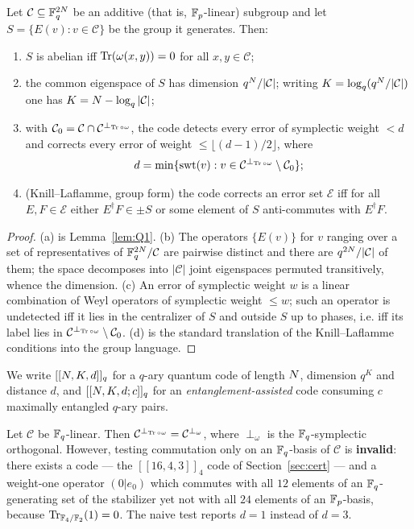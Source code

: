 \begin{lemma}\label{lem:Q2}
Let $\mathcal C\subseteq\mathbb F_q^{2N}$ be an additive (that is, $\mathbb F_p$-linear)
subgroup and let $S=\{E(v):v\in\mathcal C\}$ be the group it generates. Then:
\begin{enumerate}[label=\textnormal{(\alph*)},leftmargin=*]
\item $S$ is abelian iff $\operatorname{Tr}(\omega(x,y))=0$ for all $x,y\in\mathcal C$;
\item the common eigenspace of $S$ has dimension $q^{N}/|\mathcal C|$;
  writing $K=\log_q(q^{N}/|\mathcal C|)$ one has
  $K=N-\log_q|\mathcal C|$;
\item with $\mathcal C_0=\mathcal C\cap\mathcal C^{\perp_{\operatorname{Tr}\circ\omega}}$,
  the code detects every error of symplectic weight $<d$ and corrects every
  error of weight $\le\lfloor(d-1)/2\rfloor$, where
  \[
    d=\min\{\operatorname{swt}(v):v\in\mathcal C^{\perp_{\operatorname{Tr}\circ\omega}}\setminus
    \mathcal C_0\};
  \]
\item (Knill--Laflamme, group form) the code corrects an error set
  $\mathcal E$ iff for all $E,F\in\mathcal E$ either $E^\dagger F\in\pm S$ or
  some element of $S$ anti-commutes with $E^\dagger F$.
\end{enumerate}
\end{lemma}

\begin{proof}
(a) is Lemma~\ref{lem:Q1}. (b) The operators $\{E(v)\}$ for $v$ ranging over a
set of representatives of $\mathbb F_q^{2N}/\mathcal C$ are pairwise distinct and
there are $q^{2N}/|\mathcal C|$ of them; the space decomposes into
$|\mathcal C|$ joint eigenspaces permuted transitively, whence the dimension.
(c) An error of symplectic weight $w$ is a linear combination of Weyl operators
of symplectic weight $\le w$; such an operator is undetected iff it lies in the
centralizer of $S$ and outside $S$ up to phases, i.e. iff its label lies in
$\mathcal C^{\perp_{\operatorname{Tr}\circ\omega}}\setminus\mathcal C_0$. (d) is the standard
translation of the Knill--Laflamme conditions into the group language.
\end{proof}

We write $[[N,K,d]]_q$ for a $q$-ary quantum code of length $N$,
dimension $q^K$ and distance $d$, and $[[N,K,d;c]]_q$ for an
\emph{entanglement-assisted} code consuming $c$ maximally entangled $q$-ary
pairs.

\begin{theorem}\label{thm:fpbasis}
Let $\mathcal C$ be $\mathbb F_q$-linear. Then
$\mathcal C^{\perp_{\operatorname{Tr}\circ\omega}}=\mathcal C^{\perp_\omega}$, where
$\perp_\omega$ is the $\mathbb F_q$-symplectic orthogonal. However, testing
commutation only on an $\mathbb F_q$-basis of $\mathcal C$ is \textbf{invalid}:
there exists a code --- the $[[16,4,3]]_4$ code of
Section~\ref{sec:cert} --- and a weight-one operator $(0|e_0)$ which commutes
with all $12$ elements of an $\mathbb F_q$-generating set of the stabilizer yet not
with all $24$ elements of an $\mathbb F_p$-basis, because
$\operatorname{Tr}_{\mathbb F_4/\mathbb F_2}(1)=0$. The naive test reports $d=1$ instead of $d=3$.
\end{theorem}

